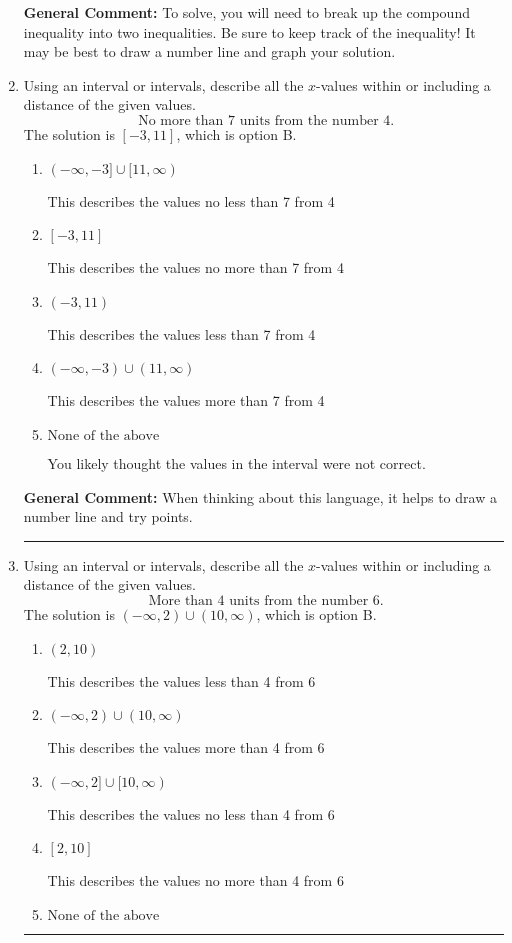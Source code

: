 \documentclass{extbook}[14pt]
\newcommand{\litem}[1]{\item #1

\rule{\textwidth}{0.4pt}}
\begin{document}
\begin{enumerate}
{\begin{enumerate}[label=\Alph*.]
\end{enumerate}

\textbf{General Comment:} To solve, you will need to break up the compound inequality into two inequalities. Be sure to keep track of the inequality! It may be best to draw a number line and graph your solution.
}
\litem{
Using an interval or intervals, describe all the $x$-values within or including a distance of the given values.
\[ \text{ No more than } 7 \text{ units from the number } 4. \]The solution is \( [-3, 11] \), which is option B.\begin{enumerate}[label=\Alph*.]
\item \( (-\infty, -3] \cup [11, \infty) \)

This describes the values no less than 7 from 4
\item \( [-3, 11] \)

This describes the values no more than 7 from 4
\item \( (-3, 11) \)

This describes the values less than 7 from 4
\item \( (-\infty, -3) \cup (11, \infty) \)

This describes the values more than 7 from 4
\item \( \text{None of the above} \)

You likely thought the values in the interval were not correct.
\end{enumerate}

\textbf{General Comment:} When thinking about this language, it helps to draw a number line and try points.
}
\litem{
Using an interval or intervals, describe all the $x$-values within or including a distance of the given values.
\[ \text{ More than } 4 \text{ units from the number } 6. \]The solution is \( (-\infty, 2) \cup (10, \infty) \), which is option B.\begin{enumerate}[label=\Alph*.]
\item \( (2, 10) \)

This describes the values less than 4 from 6
\item \( (-\infty, 2) \cup (10, \infty) \)

This describes the values more than 4 from 6
\item \( (-\infty, 2] \cup [10, \infty) \)

This describes the values no less than 4 from 6
\item \( [2, 10] \)

This describes the values no more than 4 from 6
\item \( \text{None of the above} \)


\end{enumerate}}
\end{enumerate}
\end{document}
